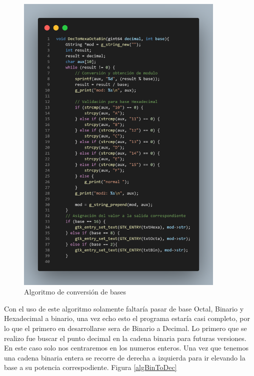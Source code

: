 \documentclass[letterpaper,12pt]{extarticle}%
\begin{document}
		\begin{figure}[H]
			\begin{center}
			\includegraphics[width=10cm]{imag//algDecToRest.png}
			\caption{Algoritmo de conversión de bases}
			\label{algDecToRest}
			\end{center}
			\end{figure}

			Con  el uso de este algoritmo solamente faltaría pasar de base Octal,
			Binario y Hexadecimal a binario, una vez echo esto el programa estaría
			casi completo, por lo que el primero en desarrollarse sera de Binario a 
			Decimal. Lo primero que se realizo fue buscar el punto decimal en la 
			cadena binaria para futuras versiones. En este caso solo nos centraremos
			en los numeros enteros. Una vez que tenemos una cadena binaria entera
			se recorre de derecha a izquierda para ir elevando la base a su potencia 
			correspodiente. Figura \ref{algBinToDec} 
			
\end{document}

